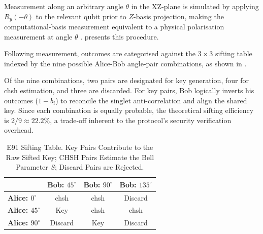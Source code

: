 \documentclass[11pt, a4paper]{report}
\renewcommand{\footnotesize}{\fontsize{9}{10}\selectfont}
\begin{document}
Measurement along an arbitrary angle $\theta$ in the XZ-plane is simulated by applying $R_y(-\theta)$ to the relevant \gls{qubit} prior to $Z$-basis projection, making the computational-basis measurement equivalent to a physical polarisation measurement at angle $\theta$ \cite{e91Qiskit}.  presents this procedure.

Following measurement, outcomes are categorised against the $3 \times 3$ \gls{sifting} table indexed by the nine possible Alice-Bob angle-pair combinations, as shown in .

Of the nine combinations, two pairs are designated for key generation, four for \gls{chsh} estimation, and three are discarded. For key pairs, Bob logically inverts his outcomes ($1 - b_i$) to reconcile the singlet anti-correlation and align the shared key. Since each combination is equally probable, the theoretical \gls{sifting} efficiency is $2/9 \approx 22.2\%$, a trade-off inherent to the protocol's security verification overhead.

\newpage
\begin{table}[htbp]
\centering
\caption{E91 Sifting Table. Key Pairs Contribute to the Raw Sifted Key; CHSH Pairs Estimate the Bell Parameter $S$; Discard Pairs are Rejected.}
\label{tab:e91_sift}
\footnotesize
\begin{tabular}{lccc}
\toprule
 & \textbf{Bob: $45^\circ$} & \textbf{Bob: $90^\circ$} & \textbf{Bob: $135^\circ$} \\
\midrule
\textbf{Alice: $0^\circ$}  & \gls{chsh} & \gls{chsh} & Discard \\
\textbf{Alice: $45^\circ$} & Key        & \gls{chsh} & \gls{chsh} \\
\textbf{Alice: $90^\circ$} & Discard    & Key        & Discard \\
\bottomrule
\end{tabular}
\end{table}

\begin{algorithm}[htbp]
    \caption{E91 Angular Measurement.}\label{alg:e91_meas}
\end{algorithm}
\end{document}
